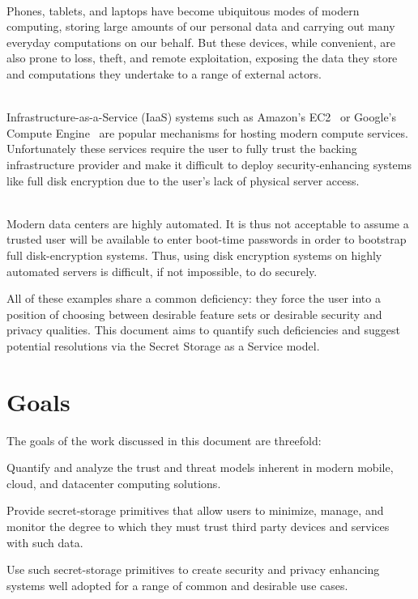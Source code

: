 \begin{packed_desc}
\item[Mobile Computing Devices] \hfill \\ Phones, tablets, and laptops
  have become ubiquitous modes of modern computing, storing large
  amounts of our personal data and carrying out many everyday
  computations on our behalf. But these devices, while convenient, are
  also prone to loss, theft, and remote exploitation, exposing the
  data they store and computations they undertake to a range of
  external actors.
\item[Cloud Computing Infrastructure] \hfill \\
  Infrastructure-as-a-Service (IaaS) systems such as Amazon's
  EC2~\cite{amazon-ec2} or Google's Compute
  Engine~\cite{google-compute} are popular mechanisms for hosting
  modern compute services. Unfortunately these services require the
  user to fully trust the backing infrastructure provider and make it
  difficult to deploy security-enhancing systems like full disk
  encryption due to the user's lack of physical server access.
\item[Datacenter Infrastructure] \hfill \\ Modern data centers are
  highly automated. It is thus not acceptable to assume a trusted user
  will be available to enter boot-time passwords in order to bootstrap
  full disk-encryption systems. Thus, using disk encryption systems on
  highly automated servers is difficult, if not impossible, to do
  securely.
\end{packed_desc}

All of these examples share a common deficiency: they force the user
into a position of choosing between desirable feature sets or
desirable security and privacy qualities. This document aims to
quantify such deficiencies and suggest potential resolutions via the
Secret Storage as a Service model.

\section{Goals}
\label{chap:intro:goals}

The goals of the work discussed in this document are threefold:

\begin{packed_item}
\item Quantify and analyze the trust and threat models inherent in
  modern mobile, cloud, and datacenter computing solutions.
\item Provide secret-storage primitives that allow users to minimize,
  manage, and monitor the degree to which they must trust third party
  devices and services with such data.
\item Use such secret-storage primitives to create security and
  privacy enhancing systems well adopted for a range of common and
  desirable use cases.
\end{packed_item}

